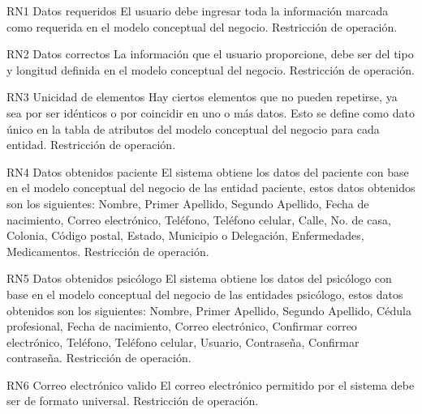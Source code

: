 \begin{BussinesRule}{RN1}{ Datos requeridos}
\BRitem[Descripción:] El usuario debe ingresar toda la información marcada como requerida en el modelo conceptual del negocio.
\BRitem[Tipo:] Restricción de operación.
\end{BussinesRule}

\begin{BussinesRule}{RN2}{ Datos correctos}
\BRitem[Descripción:] La información que el usuario proporcione, debe ser del tipo y longitud definida en el modelo conceptual del negocio.
\BRitem[Tipo:] Restricción de operación.
\end{BussinesRule}

\begin{BussinesRule}{RN3}{ Unicidad de elementos}
\BRitem[Descripción:] Hay ciertos elementos que no pueden repetirse, ya sea por ser idénticos o por coincidir en uno o más datos. Esto se define como dato único en la tabla de atributos del modelo conceptual del negocio para cada entidad.
\BRitem[Tipo:] Restricción de operación.
\end{BussinesRule}

\begin{BussinesRule}{RN4}{ Datos obtenidos paciente}
\BRitem[Descripción:] El sistema obtiene los datos del paciente con base en el modelo conceptual del negocio de las entidad paciente, estos datos obtenidos son los siguientes: Nombre, Primer Apellido, Segundo Apellido, Fecha de nacimiento, Correo electrónico, Teléfono, Teléfono celular, Calle, No. de casa, Colonia, Código postal, Estado, Municipio o Delegación, Enfermedades, Medicamentos.
\BRitem[Tipo:] Restricción de operación.
\end{BussinesRule}

\begin{BussinesRule}{RN5}{ Datos obtenidos psicólogo}
\BRitem[Descripción:] El sistema obtiene los datos del psicólogo con base en el modelo conceptual del negocio de las entidades psicólogo, estos datos obtenidos son los siguientes: Nombre, Primer Apellido, Segundo Apellido, Cédula profesional, Fecha de nacimiento, Correo electrónico, Confirmar correo electrónico, Teléfono, Teléfono celular, Usuario, Contraseña, Confirmar contraseña.
\BRitem[Tipo:] Restricción de operación.
\end{BussinesRule}

\begin{BussinesRule}{RN6}{ Correo electrónico valido}
\BRitem[Descripción:] El correo electrónico permitido por el sistema debe ser de formato universal.
\BRitem[Tipo:] Restricción de operación.
\end{BussinesRule}

